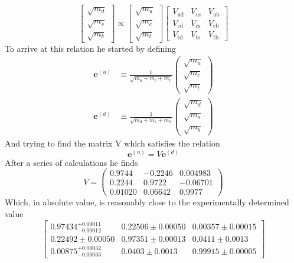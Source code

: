 \documentclass[twoside,twocolumn,11pt]{article} %
\begin{document}
\begin{equation}
	\left[\begin{array}{c}
		\sqrt{m_d} \\
		\sqrt{m_s} \\
		\sqrt{m_b}
	\end{array}\right]\propto
	\left[\begin{array}{c}
		\sqrt{m_u} \\
		\sqrt{m_c} \\
		\sqrt{m_t}
	\end{array}\right]
	\left[\begin{array}{lll}
		V_{\mathrm{ud}} & V_{\mathrm{us}} & V_{\mathrm{ub}} \\
		V_{\mathrm{cd}} & V_{\mathrm{cs}} & V_{\mathrm{cb}} \\
		V_{\mathrm{td}} & V_{\mathrm{ts}} & V_{\mathrm{tb}}
	\end{array}\right]
\end{equation}
To arrive at this relation he started by defining
\begin{align}
	\boldsymbol{e}^{(u)} &\equiv \frac{1}{\sqrt{m_{u}+m_{c}+m_{t}}}\left(\begin{array}{c}
		\sqrt{m_{u}} \\
		\sqrt{m_{c}} \\
		\sqrt{m_{t}}
	\end{array}\right)\\ \boldsymbol{e}^{(d)} &\equiv \frac{1}{\sqrt{m_{d}+m_{s}+m_{b}}}\left(\begin{array}{c}
		\sqrt{m_{d}} \\
		\sqrt{m_{s}} \\
		\sqrt{m_{b}}
	\end{array}\right)
\end{align}
And trying to find the matrix V which satisfies the relation
\begin{equation}
	\boldsymbol{e}^{(u)} = V\boldsymbol{e}^{(d)}
\end{equation}
After a series of calculations he finds
\begin{equation}
	V=\left(\begin{array}{ccc}
		0.9744 & -0.2246 & 0.004983 \\
		0.2244 & 0.9722 & -0.06701 \\
		0.01020 & 0.06642 & 0.9977
	\end{array}\right)
\end{equation}
Which, in absolute value, is reasonably close to the experimentally determined value
\begin{equation*}
	\left[\begin{array}{ccc}
		0.97434_{-0.00012}^{+0.00011} & 0.22506 \pm 0.00050 & 0.00357 \pm 0.00015 \\
		0.22492 \pm 0.00050 & 0.97351 \pm 0.00013 & 0.0411 \pm 0.0013 \\
		0.00875_{-0.00033}^{+0.00032} & 0.0403 \pm 0.0013 & 0.99915 \pm 0.00005
	\end{array}\right]
\end{equation*}
\end{document}
